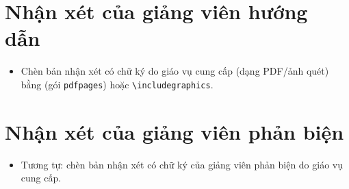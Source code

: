 \chapter*{Nhận xét của giảng viên hướng dẫn}

\begin{goiy}
  \begin{itemize}
    \item Chèn bản nhận xét có chữ ký do giáo vụ cung cấp (dạng PDF/ảnh quét) bằng \verb|| (gói \texttt{pdfpages}) hoặc \verb|\includegraphics|.
  \end{itemize}
\end{goiy}

\clearpage
\chapter*{Nhận xét của giảng viên phản biện}

\begin{goiy}
  \begin{itemize}
    \item Tương tự: chèn bản nhận xét có chữ ký của giảng viên phản biện do giáo vụ cung cấp.
  \end{itemize}
\end{goiy}
